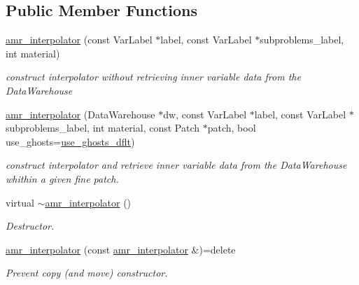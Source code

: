 \subsection*{Public Member Functions}
\begin{DoxyCompactItemize}
\item 
\hyperlink{classUintah_1_1PhaseField_1_1detail_1_1amr__interpolator_3_01ScalarField_3_01T_01_4_00_01Problemd2db9de1754b5450c93c191a9275f5ed_ad916da29eec73351ea6fb0fd54d24a86}{amr\+\_\+interpolator} (const Var\+Label $\ast$label, const Var\+Label $\ast$subproblems\+\_\+label, int material)
\begin{DoxyCompactList}\small\item\em construct interpolator without retrieving inner variable data from the Data\+Warehouse \end{DoxyCompactList}\item 
\hyperlink{classUintah_1_1PhaseField_1_1detail_1_1amr__interpolator_3_01ScalarField_3_01T_01_4_00_01Problemd2db9de1754b5450c93c191a9275f5ed_a09018bc2f75f6f87bb893dd7caf831aa}{amr\+\_\+interpolator} (Data\+Warehouse $\ast$dw, const Var\+Label $\ast$label, const Var\+Label $\ast$subproblems\+\_\+label, int material, const Patch $\ast$patch, bool use\+\_\+ghosts=\hyperlink{classUintah_1_1PhaseField_1_1detail_1_1amr__interpolator_3_01ScalarField_3_01T_01_4_00_01Problemd2db9de1754b5450c93c191a9275f5ed_a05a1e360547dde624240ae943f6ced4b}{use\+\_\+ghosts\+\_\+dflt})
\begin{DoxyCompactList}\small\item\em construct interpolator and retrieve inner variable data from the Data\+Warehouse whithin a given fine patch. \end{DoxyCompactList}\item 
virtual \hyperlink{classUintah_1_1PhaseField_1_1detail_1_1amr__interpolator_3_01ScalarField_3_01T_01_4_00_01Problemd2db9de1754b5450c93c191a9275f5ed_a9d452934993c1a509d4da611ae087494}{$\sim$amr\+\_\+interpolator} ()
\begin{DoxyCompactList}\small\item\em Destructor. \end{DoxyCompactList}\item 
\hyperlink{classUintah_1_1PhaseField_1_1detail_1_1amr__interpolator_3_01ScalarField_3_01T_01_4_00_01Problemd2db9de1754b5450c93c191a9275f5ed_a6eb4d51ce7b438faf75dceeb700627c0}{amr\+\_\+interpolator} (const \hyperlink{classUintah_1_1PhaseField_1_1detail_1_1amr__interpolator}{amr\+\_\+interpolator} \&)=delete
\begin{DoxyCompactList}\small\item\em Prevent copy (and move) constructor. \end{DoxyCompactList}\item 

\end{DoxyCompactItemize}
